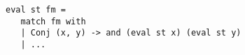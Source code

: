 

\begin{figure}[!t]
  \centering
  \begin{minipage}{0.82\textwidth}
    \begin{lstlisting}[frame=tb]
 eval st fm =
   match fm with
   | Conj (x, y) -> and (eval st x) (eval st y)
   | ...
    \end{lstlisting}
  \end{minipage}
\end{figure}

